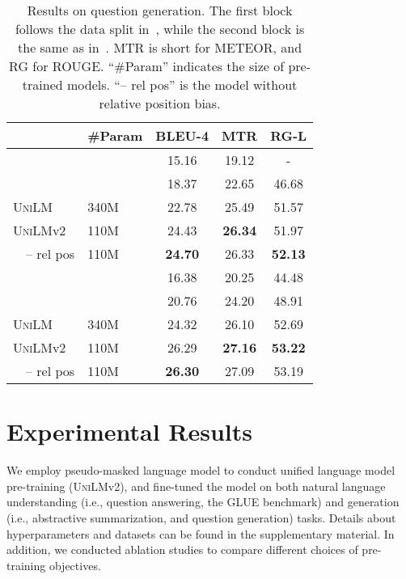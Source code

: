 \documentclass{article}
\newcommand\pmlmfull{pseudo-masked language model}
\newcommand{\vonelarge}{\textsc{UniLM}}
\newcommand{\unilmvtwo}{\textsc{UniLM}v2}
\newcommand{\vtwobase}{\textsc{UniLM}v2}
\newcommand\norelpos{-- rel pos}
\begin{document}
\begin{table}[t]
\centering
\begin{tabular}{l l c c c}
\toprule
    & \textbf{\#Param} & \textbf{BLEU-4} & \textbf{MTR}   & \textbf{RG-L}  \\ \midrule
\multicolumn{2}{l}{\cite{du-qg-2018}}    & 15.16           & 19.12          & -              \\
\multicolumn{2}{l}{\cite{zhang-qg-2019}} & 18.37           & 22.65          & 46.68          \\
\vonelarge{} & 340M        & 22.78           & 25.49          & 51.57          \\
\vtwobase{} & 110M         & {24.43} & \textbf{26.34} & {51.97} \\
~~\norelpos{} & 110M          & \textbf{24.70}  & {26.33} & \textbf{52.13} \\
\midrule
\multicolumn{2}{l}{\cite{zhao-qg-2018}}  & 16.38           & 20.25          & 44.48          \\
\multicolumn{2}{l}{\cite{zhang-qg-2019}} & 20.76           & 24.20          & 48.91          \\
\vonelarge{} & 340M        & 24.32           & 26.10          & 52.69          \\
\vtwobase{} & 110M          & {26.29} & \textbf{27.16} & \textbf{53.22} \\
~~\norelpos{} & 110M          & \textbf{26.30}  & {27.09} & {53.19} \\
\bottomrule
\end{tabular}
\caption{
Results on question generation.
The first block follows the data split in~\cite{du-qg-2018}, while the second block is the same as in~\cite{zhao-qg-2018}.
MTR is short for METEOR, and RG for ROUGE.
``\#Param'' indicates the size of pre-trained models.
``\norelpos{}'' is the model without relative position bias.
}
\label{tbl:qg:base}
\end{table}


\section{Experimental Results}

We employ \pmlmfull{} to conduct unified language model pre-training (\unilmvtwo{}), and fine-tuned the model on both natural language understanding (i.e., question answering, the GLUE benchmark) and generation (i.e., abstractive summarization, and question generation) tasks.
Details about hyperparameters and datasets can be found in the supplementary material.
In addition, we conducted ablation studies to compare different choices of pre-training objectives.
\end{document}
